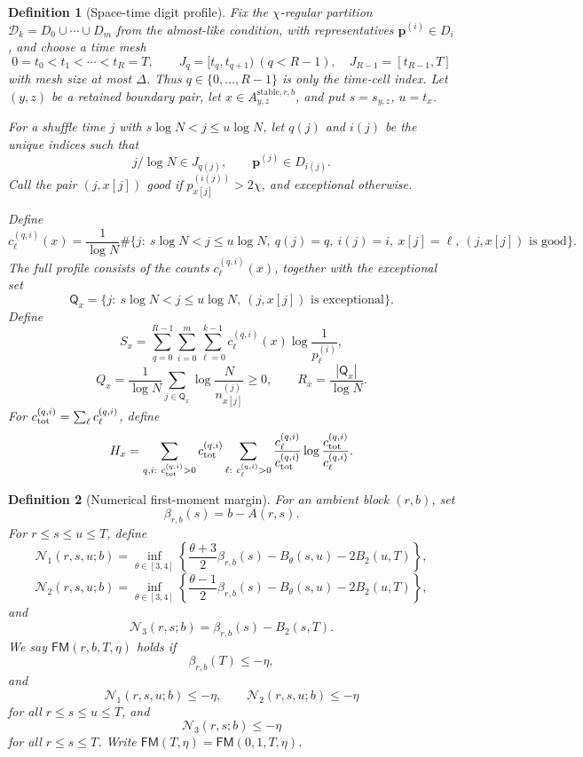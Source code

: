 \documentclass[11pt]{article}
\newtheorem{defi}{Definition}
\newcommand{\cD}{\mathcal D}
\newcommand{\bp}{\mathbf p}
\newcommand{\stable}{\mathrm{stable}}
\begin{document}
\begin{defi}[Space-time digit profile]
Fix the \(\chi\)-regular partition
\(\cD_k=D_0\cup\cdots\cup D_m\) from the almost-like condition, with
representatives \(\bp^{(i)}\in D_i\), and choose a time mesh
\[
    0=t_0<t_1<\cdots<t_R=T,\qquad J_q=[t_q,t_{q+1})\ (q<R-1),\quad J_{R-1}=[t_{R-1},T]
\]
with mesh size at most \(\Delta\). Thus \(q\in\{0,\ldots,R-1\}\) is only the time-cell index. Let \((y,z)\) be a retained boundary pair, let \(x\in A_{y,z}^{\stable,r,b}\), and put \(s=s_{y,z}\), \(u=t_x\).

For a shuffle time \(j\) with \(s\log N<j\le u\log N\), let \(q(j)\) and \(i(j)\) be the unique indices such that
\[
    j/\log N\in J_{q(j)},\qquad \bp^{(j)}\in D_{i(j)}.
\]
Call the pair \((j,x[j])\) good if \(p_{x[j]}^{(i(j))}>2\chi\), and exceptional otherwise.

Define
\[
    c_\ell^{(q,i)}(x)
    =
    \frac1{\log N}
    \#\{j:\ s\log N<j\le u\log N,\ q(j)=q,\ i(j)=i,\ x[j]=\ell,\ (j,x[j])\text{ is good}\}.
\]
The full profile consists of the counts \(c_\ell^{(q,i)}(x)\), together with the exceptional set
\[
    \mathsf Q_x=\{j:\ s\log N<j\le u\log N,\ (j,x[j])\text{ is exceptional}\}.
\]
Define
\[
    S_x=\sum_{q=0}^{R-1}\sum_{i=0}^m\sum_{\ell=0}^{k-1}
    c_\ell^{(q,i)}(x)\log\frac1{p_\ell^{(i)}},
\]
\[
    Q_x=\frac1{\log N}\sum_{j\in\mathsf Q_x}
    \log\frac{N}{n_{x[j]}^{(j)}}\ge0,
    \qquad
    R_x=\frac{|\mathsf Q_x|}{\log N}.
\]
For \(c_{\rm tot}^{(q,i)}=\sum_\ell c_\ell^{(q,i)}\), define
\[
    H_x
    =
    \sum_{q,i:\ c_{\rm tot}^{(q,i)}>0}
    c_{\rm tot}^{(q,i)}
    \sum_{\ell:\ c_\ell^{(q,i)}>0}
    \frac{c_\ell^{(q,i)}}{c_{\rm tot}^{(q,i)}}
    \log\frac{c_{\rm tot}^{(q,i)}}{c_\ell^{(q,i)}} .
\]
\end{defi}

\begin{defi}[Numerical first-moment margin]
For an ambient block \((r,b)\), set
\[
    \beta_{r,b}(s)=b-A(r,s).
\]
For \(r\le s\le u\le T\), define
\[
    \mathcal N_1(r,s,u;b)
    =
    \inf_{\theta\in[3,4]}
    \left\{\frac{\theta+3}{2}\beta_{r,b}(s)-B_\theta(s,u)-2B_2(u,T)\right\},
\]
\[
    \mathcal N_2(r,s,u;b)
    =
    \inf_{\theta\in[3,4]}
    \left\{\frac{\theta-1}{2}\beta_{r,b}(s)-B_\theta(s,u)-2B_2(u,T)\right\},
\]
and
\[
    \mathcal N_3(r,s;b)=\beta_{r,b}(s)-B_2(s,T).
\]
We say \(\mathsf{FM}(r,b,T,\eta)\) holds if
\[
    \beta_{r,b}(T)\le -\eta,
\]
and
\[
    \mathcal N_1(r,s,u;b)\le-\eta,\qquad
    \mathcal N_2(r,s,u;b)\le-\eta
\]
for all \(r\le s\le u\le T\), and
\[
    \mathcal N_3(r,s;b)\le-\eta
\]
for all \(r\le s\le T\). Write \(\mathsf{FM}(T,\eta)=\mathsf{FM}(0,1,T,\eta)\).
\end{defi}
\end{document}
